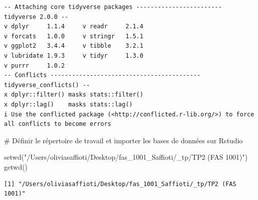 \documentclass[
  letterpaper,
  DIV=11,
  numbers=noendperiod]{scrartcl}
\newenvironment{Shaded}{\begin{snugshade}}{\end{snugshade}}
\newcommand{\CommentTok}[1]{\textcolor[rgb]{0.37,0.37,0.37}{#1}}
\newcommand{\FunctionTok}[1]{\textcolor[rgb]{0.28,0.35,0.67}{#1}}
\newcommand{\NormalTok}[1]{\textcolor[rgb]{0.00,0.23,0.31}{#1}}
\newcommand{\StringTok}[1]{\textcolor[rgb]{0.13,0.47,0.30}{#1}}
\begin{document}
\begin{verbatim}
-- Attaching core tidyverse packages ------------------------ tidyverse 2.0.0 --
v dplyr     1.1.4     v readr     2.1.4
v forcats   1.0.0     v stringr   1.5.1
v ggplot2   3.4.4     v tibble    3.2.1
v lubridate 1.9.3     v tidyr     1.3.0
v purrr     1.0.2     
-- Conflicts ------------------------------------------ tidyverse_conflicts() --
x dplyr::filter() masks stats::filter()
x dplyr::lag()    masks stats::lag()
i Use the conflicted package (<http://conflicted.r-lib.org/>) to force all conflicts to become errors
\end{verbatim}

\begin{Shaded}
\begin{Highlighting}[]
\CommentTok{\# Définir le répertoire de travail et importer les bases de données sur Rstudio}

\FunctionTok{setwd}\NormalTok{(}\StringTok{"/Users/oliviasaffioti/Desktop/fas\_1001\_Saffioti/\_tp/TP2 (FAS 1001)"}\NormalTok{)}
\FunctionTok{getwd}\NormalTok{()}
\end{Highlighting}
\end{Shaded}

\begin{verbatim}
[1] "/Users/oliviasaffioti/Desktop/fas_1001_Saffioti/_tp/TP2 (FAS 1001)"
\end{verbatim}
\end{document}
